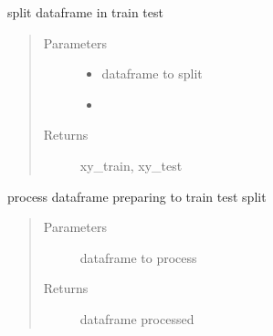 \documentclass[letterpaper,10pt,english]{sphinxmanual}
\begin{document}
\sphinxAtStartPar
{}

\label{\detokenize{algorithms:module-algorithms.ira.ira_trainer}}

\begin{fulllineitems}
\label{\detokenize{algorithms:algorithms.ira.ira_trainer.__create_train_test}}
\sphinxAtStartPar
split dataframe in train test
\begin{quote}\begin{description}
\item[{Parameters}] \leavevmode\begin{itemize}
\item {} 
\sphinxAtStartPar
{} \textendash{} dataframe to split

\item {} 
\sphinxAtStartPar
{} \textendash{} 

\end{itemize}

\item[{Returns}] \leavevmode
\sphinxAtStartPar
xy\_train, xy\_test

\end{description}\end{quote}

\end{fulllineitems}


\begin{fulllineitems}
\label{\detokenize{algorithms:algorithms.ira.ira_trainer.__do_processing}}
\sphinxAtStartPar
process dataframe preparing to train test split
\begin{quote}\begin{description}
\item[{Parameters}] \leavevmode
\sphinxAtStartPar
{} \textendash{} dataframe to process

\item[{Returns}] \leavevmode
\sphinxAtStartPar
dataframe processed

\end{description}\end{quote}

\end{fulllineitems}
\end{document}
